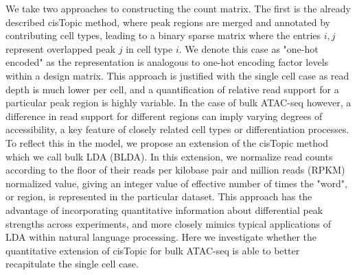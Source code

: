 We take two approaches to constructing the count matrix. The first is the already described cisTopic method, where peak regions are merged and annotated by contributing cell types, leading to a binary sparse matrix where the entries $i, j$ represent overlapped peak $j$ in cell type $i$. We denote this case as "one-hot encoded" as the representation is analogous to one-hot encoding factor levels within a design matrix. This approach is justified with the single cell case as read depth is much lower per cell, and a quantification of relative read support for a particular peak region is highly variable. In the case of bulk ATAC-seq however, a difference in read support for different regions can imply varying degrees of accessibility, a key feature of closely related cell types or differentiation processes.   To reflect this in the model, we propose an extension of the cisTopic method which we call bulk LDA (BLDA). In this extension, we normalize read counts according to the floor of their reads per kilobase pair and million reads (RPKM) normalized value, giving an integer value of effective number of times the "word", or region, is represented in the particular dataset. This approach has the advantage of incorporating quantitative information about differential peak strengths across experiments, and more closely mimics typical applications of LDA within natural language processing. Here we investigate whether the quantitative extension of cisTopic for bulk ATAC-seq is able to better recapitulate the single cell case.

